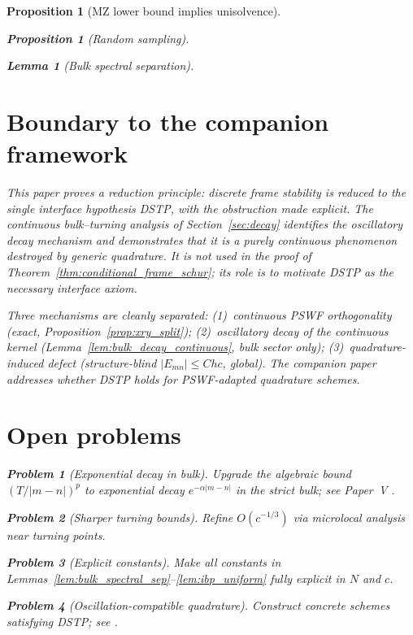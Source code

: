 \documentclass[12pt,a4paper]{amsart}
\newtheorem{lemma}[theorem]{Lemma}
\newtheorem{proposition}[theorem]{Proposition}
\theoremstyle{definition}
\newtheorem{problem}{Problem}[section]
\begin{document}
\begin{proposition}[MZ lower bound implies unisolvence]
\begin{proposition}[Random sampling]
\begin{lemma}[Bulk spectral separation]
\section{Boundary to the companion framework}\label{sec:bridge}

This paper proves a reduction principle: discrete frame stability is
reduced to the single interface hypothesis DSTP, with the obstruction
made explicit. The continuous bulk--turning analysis of
Section~\ref{sec:decay} identifies the oscillatory decay mechanism
and demonstrates that it is a purely continuous phenomenon destroyed
by generic quadrature. It is not used in the proof of
Theorem~\ref{thm:conditional_frame_schur}; its role is to motivate
DSTP as the necessary interface axiom.

Three mechanisms are cleanly separated:
(1)~continuous PSWF orthogonality (exact,
Proposition~\ref{prop:xry_split});
(2)~oscillatory decay of the continuous kernel
(Lemma~\ref{lem:bulk_decay_continuous}, bulk sector only);
(3)~quadrature-induced defect (structure-blind $|E_{mn}|\le Chc$,
global). The companion paper~\cite{PaperIIquad} addresses whether
DSTP holds for PSWF-adapted quadrature schemes.

\section{Open problems}\label{sec:open}

\begin{problem}[Exponential decay in bulk]
Upgrade the algebraic bound $(T/|m-n|)^p$ to exponential decay
$e^{-\alpha|m-n|}$ in the strict bulk; see Paper~V \cite{PaperV}.
\end{problem}

\begin{problem}[Sharper turning bounds]
Refine $O(c^{-1/3})$ via microlocal analysis near turning points.
\end{problem}

\begin{problem}[Explicit constants]
Make all constants in
Lemmas~\ref{lem:bulk_spectral_sep}--\ref{lem:ibp_uniform}
fully explicit in $N$ and $c$.
\end{problem}

\begin{problem}[Oscillation-compatible quadrature]
Construct concrete schemes satisfying DSTP; see \cite{PaperIIquad}.
\end{problem}


\end{lemma}
\end{proposition}
\end{proposition}
\end{document}
